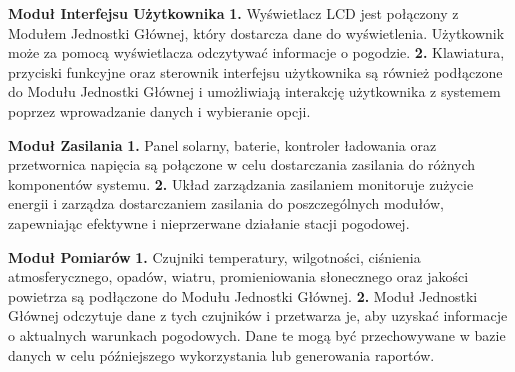 \documentclass{article}
\begin{document}
\begin{flushleft}
    \Large \textbf{Moduł Interfejsu Użytkownika} \newline \newline
    \large
    \textbf{1.} Wyświetlacz LCD jest połączony z Modułem Jednostki Głównej, który dostarcza dane do wyświetlenia. Użytkownik może za pomocą wyświetlacza odczytywać informacje o pogodzie. \newline \newline
    \textbf{2.} Klawiatura, przyciski funkcyjne oraz sterownik interfejsu użytkownika są również podłączone do Modułu Jednostki Głównej i umożliwiają interakcję użytkownika z systemem poprzez wprowadzanie danych i wybieranie opcji. \newline \newline
\end{flushleft}
\begin{flushleft}
    \Large \textbf{Moduł Zasilania} \newline \newline
    \large
    \textbf{1.} Panel solarny, baterie, kontroler ładowania oraz przetwornica napięcia są połączone w celu dostarczania zasilania do różnych komponentów systemu. \newline \newline
    \textbf{2.} Układ zarządzania zasilaniem monitoruje zużycie energii i zarządza dostarczaniem zasilania do poszczególnych modułów, zapewniając efektywne i nieprzerwane działanie stacji pogodowej. \newline \newline
\end{flushleft}
\begin{flushleft}
    \Large \textbf{Moduł Pomiarów} \newline \newline
    \large
    \textbf{1.} Czujniki temperatury, wilgotności, ciśnienia atmosferycznego, opadów, wiatru, promieniowania słonecznego oraz jakości powietrza są podłączone do Modułu Jednostki Głównej. \newline \newline
    \textbf{2.} Moduł Jednostki Głównej odczytuje dane z tych czujników i przetwarza je, aby uzyskać informacje o aktualnych warunkach pogodowych. Dane te mogą być przechowywane w bazie danych w celu późniejszego wykorzystania lub generowania raportów. \newline \newline
\end{flushleft}
\end{document}
